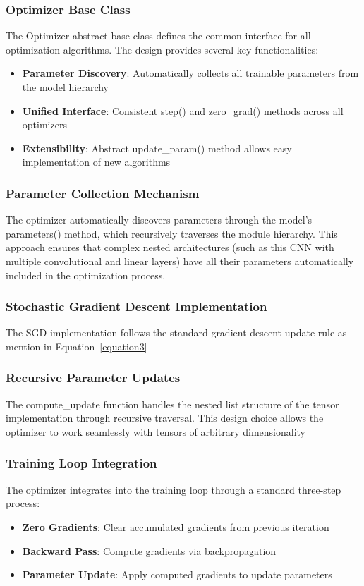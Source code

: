 \documentclass[conference]{IEEEtran}
\begin{document}
\subsubsection{Optimizer Base Class}
The Optimizer abstract base class defines the common interface for all optimization algorithms. The design provides several key functionalities:

\begin{itemize}
\item \textbf{Parameter Discovery}: Automatically collects all trainable parameters from the model hierarchy
\item \textbf{Unified Interface}: Consistent step() and zero\_grad() methods across all optimizers
\item \textbf{Extensibility}: Abstract update\_param() method allows easy implementation of new algorithms
\end{itemize}

\subsubsection{Parameter Collection Mechanism}
The optimizer automatically discovers parameters through the model's parameters() method, which recursively traverses the module hierarchy. This approach ensures that complex nested architectures (such as this CNN with multiple convolutional and linear layers) have all their parameters automatically included in the optimization process.

\subsubsection{Stochastic Gradient Descent Implementation}
The SGD implementation follows the standard gradient descent update rule as mention in Equation~\ref{equation3}

\subsubsection{Recursive Parameter Updates}
The compute\_update function handles the nested list structure of the tensor implementation through recursive traversal. This design choice allows the optimizer to work seamlessly with tensors of arbitrary dimensionality

\subsubsection{Training Loop Integration}
The optimizer integrates into the training loop through a standard three-step process:
\begin{itemize}
\item \textbf{Zero Gradients}: Clear accumulated gradients from previous iteration
\item \textbf{Backward Pass}: Compute gradients via backpropagation
\item \textbf{Parameter Update}: Apply computed gradients to update parameters
\end{itemize}
\end{document}
